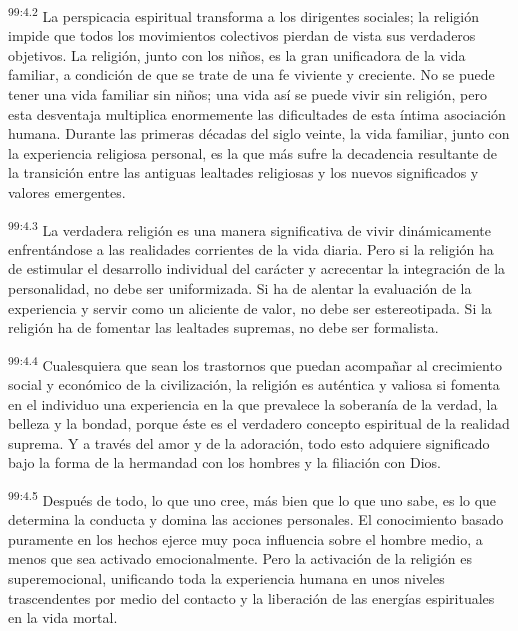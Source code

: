 \documentclass[twoside, 11pt]{book}
\begin{document}
\par
\textsuperscript{99:4.2} La perspicacia espiritual transforma a los dirigentes sociales; la religión impide que todos los movimientos colectivos pierdan de vista sus verdaderos objetivos. La religión, junto con los niños, es la gran unificadora de la vida familiar, a condición de que se trate de una fe viviente y creciente. No se puede tener una vida familiar sin niños; una vida así se puede vivir sin religión, pero esta desventaja multiplica enormemente las dificultades de esta íntima asociación humana. Durante las primeras décadas del siglo veinte, la vida familiar, junto con la experiencia religiosa personal, es la que más sufre la decadencia resultante de la transición entre las antiguas lealtades religiosas y los nuevos significados y valores emergentes.

\par
\textsuperscript{99:4.3} La verdadera religión es una manera significativa de vivir dinámicamente enfrentándose a las realidades corrientes de la vida diaria. Pero si la religión ha de estimular el desarrollo individual del carácter y acrecentar la integración de la personalidad, no debe ser uniformizada. Si ha de alentar la evaluación de la experiencia y servir como un aliciente de valor, no debe ser estereotipada. Si la religión ha de fomentar las lealtades supremas, no debe ser formalista.

\par
\textsuperscript{99:4.4} Cualesquiera que sean los trastornos que puedan acompañar al crecimiento social y económico de la civilización, la religión es auténtica y valiosa si fomenta en el individuo una experiencia en la que prevalece la soberanía de la verdad, la belleza y la bondad, porque éste es el verdadero concepto espiritual de la realidad suprema. Y a través del amor y de la adoración, todo esto adquiere significado bajo la forma de la hermandad con los hombres y la filiación con Dios.

\par
\textsuperscript{99:4.5} Después de todo, lo que uno cree, más bien que lo que uno sabe, es lo que determina la conducta y domina las acciones personales. El conocimiento basado puramente en los hechos ejerce muy poca influencia sobre el hombre medio, a menos que sea activado emocionalmente. Pero la activación de la religión es superemocional, unificando toda la experiencia humana en unos niveles trascendentes por medio del contacto y la liberación de las energías espirituales en la vida mortal.
\end{document}
